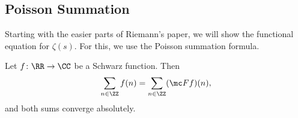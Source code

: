 \documentclass[../notes.tex]{subfiles}
\begin{document}
\subsection{Poisson Summation}
Starting with the easier parts of Riemann's paper, we will show the functional equation for $\zeta(s)$. For this, we use the Poisson summation formula.
\begin{theorem} \label{thm:ps}
	Let $f\colon\RR\to\CC$ be a Schwarz function. Then
	\[\sum_{n\in\ZZ}f(n)=\sum_{n\in\ZZ}(\mc Ff)(n),\]
	and both sums converge absolutely.
\end{theorem}
\end{document}
